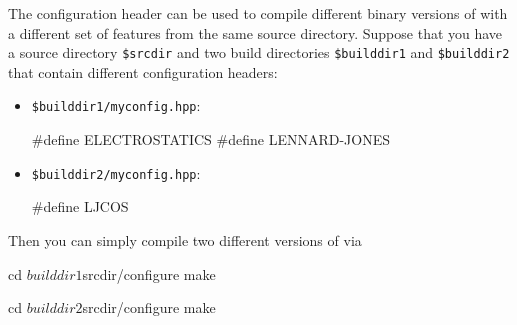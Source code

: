 The configuration header can be used to compile different binary
versions of \es with a different set of features from the same source
directory.  Suppose that you have a source directory \texttt{\$srcdir}
and two build directories \texttt{\$builddir1} and
\texttt{\$builddir2} that contain different configuration headers:

\begin{itemize}
\item \texttt{\$builddir1/myconfig.hpp}:
\begin{code}
#define ELECTROSTATICS
#define LENNARD-JONES
\end{code}

\item \texttt{\$builddir2/myconfig.hpp}:
\begin{code}
#define LJCOS
\end{code}
\end{itemize}

\noindent Then you can simply compile two different versions of \es via
\begin{code}
cd $builddir1
$srcdir/configure
make

cd $builddir2
$srcdir/configure
make
\end{code}


